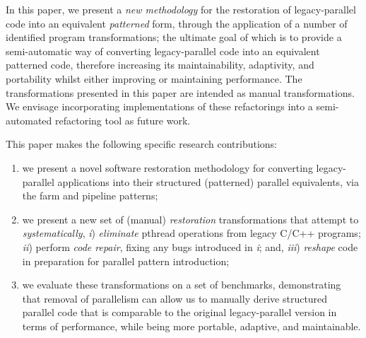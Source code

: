 %
In this paper, we present a \emph{new methodology} for the restoration of legacy-parallel code into an equivalent \emph{patterned} form, through the application of a number of identified program transformations; the ultimate goal of which is to provide a semi-automatic way of converting legacy-parallel code into an equivalent patterned code, therefore increasing its maintainability, adaptivity, and portability 
whilst either improving or maintaining performance. The transformations presented in this paper are intended as manual transformations. We envisage incorporating implementations of these refactorings into a semi-automated refactoring tool as future work.

This paper makes the following specific research contributions:
%
\begin{enumerate}
    \item we present a novel software restoration methodology for converting legacy-parallel applications into their structured (patterned) parallel equivalents, via the farm and pipeline patterns;
    \item we present a new set of (manual) \emph{restoration} transformations that attempt to \emph{systematically}, \emph{i}) \emph{eliminate} pthread operations from legacy C/C++ programs; \emph{ii}) perform \emph{code repair}, fixing any bugs introduced in \emph{i}; and, \emph{iii}) \emph{reshape} code in preparation for parallel pattern introduction;
    \item we evaluate these transformations on a set of benchmarks, demonstrating that removal of parallelism can allow us to manually derive structured parallel code that is comparable to the original legacy-parallel version in terms of performance, while being more portable, adaptive, and maintainable.
\end{enumerate}

